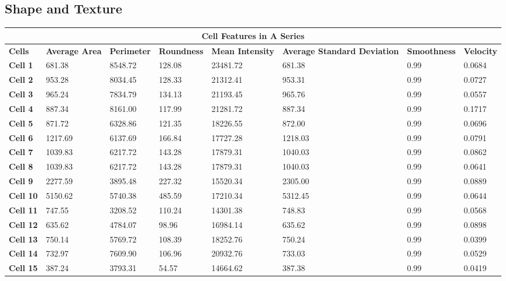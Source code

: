 \documentclass{article}
\begin{document}
\subsection*{Shape and Texture}


\begin{table}[h!]
\centering
\begin{tabular}{ |p{1.7cm}|p{1.7cm}|p{1.7cm}|p{1.7cm}|p{1.7cm}|p{1.7cm}|p{1.7cm}| p{1.7cm}|}
\hline
\multicolumn{8}{|c|}{\textbf{Cell Features in A Series}} \\
\hline
\textbf{Cells} & \textbf{Average Area} & \textbf{Perimeter} & \textbf{Roundness} & \textbf{Mean Intensity} & \textbf{Average Standard Deviation} & \textbf{Smoothness} & \textbf{Velocity} \\
\hline
\textbf{Cell 1} & 681.38 & 8548.72 & 128.08 & 23481.72 & 681.38 & 0.99 &  0.0684 \\
\textbf{Cell 2} & 953.28 & 8034.45 & 128.33 & 21312.41 & 953.31 & 0.99 & 0.0727 \\
\textbf{Cell 3} & 965.24 & 7834.79 & 134.13 & 21193.45 & 965.76 & 0.99 & 0.0557 \\
\textbf{Cell 4} & 887.34 & 8161.00 & 117.99 & 21281.72 & 887.34 & 0.99 & 0.1717\\
\textbf{Cell 5} & 871.72 & 6328.86 & 121.35 & 18226.55 & 872.00 & 0.99 & 0.0696\\
\textbf{Cell 6} & 1217.69 & 6137.69 & 166.84 & 17727.28 & 1218.03 & 0.99 & 0.0791\\
\textbf{Cell 7} & 1039.83 & 6217.72 & 143.28 & 17879.31 & 1040.03 & 0.99 & 0.0862\\
\textbf{Cell 8} & 1039.83 & 6217.72 & 143.28 & 17879.31 & 1040.03 & 0.99 & 0.0641\\
\textbf{Cell 9} & 2277.59 & 3895.48 & 227.32 & 15520.34 & 2305.00 & 0.99 & 0.0889\\
\textbf{Cell 10} & 5150.62 & 5740.38 & 485.59 & 17210.34 & 5312.45 & 0.99 & 0.0644\\
\textbf{Cell 11} & 747.55 & 3208.52 & 110.24 & 14301.38 & 748.83 & 0.99 & 0.0568  \\
\textbf{Cell 12} & 635.62 & 4784.07 & 98.96 & 16984.14 & 635.62 & 0.99 & 0.0898\\
\textbf{Cell 13} & 750.14 & 5769.72 & 108.39 & 18252.76 & 750.24 & 0.99 & 0.0399 \\
\textbf{Cell 14} & 732.97 & 7609.90 & 106.96 & 20932.76 & 733.03 & 0.99 &  0.0529 \\
\textbf{Cell 15} & 387.24 & 3793.31 & 54.57 & 14664.62 & 387.38 & 0.99 & 0.0419\\
\hline
\end{tabular}
\end{table}
\end{document}
